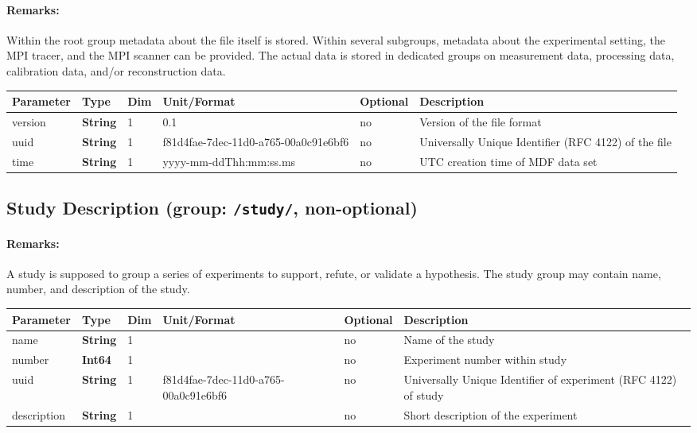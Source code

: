\documentclass[landscape,a4paper]{article} %
\newcommand{\inl}[1]{\lstinline[columns=fixed]{#1}}
\newcommand{\inltab}[1]{{\ttfamily\bfseries\color{blue}#1}}
\newcommand{\inlvar}[1]{{\ttfamily#1}}
\begin{document}
\begin{multicols}{2}
\paragraph{Remarks:} Within the root group metadata about the file itself is stored. Within several subgroups, metadata about the experimental setting, the MPI tracer, and the MPI scanner can be provided. The actual data is stored in dedicated groups on measurement data, processing data, calibration data, and/or reconstruction data.
\end{multicols}

\noindent \begin{tabularx}{\columnwidth}{lllllX} 
\textbf{Parameter} & \textbf{Type} & \textbf{Dim} & \textbf{Unit/Format} & \textbf{Optional} & \textbf{Description} \\ \hline 
\inlvar{version} & \inltab{String} & 1 & 0.1 & no & Version of the file format \\ \hline
\inlvar{uuid} & \inltab{String} & 1 & f81d4fae-7dec-11d0-a765-00a0c91e6bf6 & no & Universally Unique Identifier (RFC 4122) of the file \\ \hline 
\inlvar{time} & \inltab{String} & 1 & yyyy-mm-ddThh:mm:ss.ms & no & UTC creation time of MDF data set \\ \hline
\end{tabularx}


\subsection{Study Description (group: \inl{/study/}, non-optional)}

\begin{multicols}{2}
	\paragraph{Remarks:} A study is supposed to group a series of experiments to support, refute, or validate a hypothesis. The study group may contain \inlvar{name}, \inlvar{number}, and \inlvar{description} of the study.
\end{multicols}

\noindent \begin{tabularx}{\columnwidth}{lllllX} 
\textbf{Parameter} & \textbf{Type} & \textbf{Dim} & \textbf{Unit/Format} & \textbf{Optional} & \textbf{Description} \\ \hline 
\inlvar{name} & \inltab{String} & 1 & & no & Name of the study \\ \hline
\inlvar{number} & \inltab{Int64} & 1 & & no & Experiment number within study \\ \hline
\inlvar{uuid} & \inltab{String} & 1 & f81d4fae-7dec-11d0-a765-00a0c91e6bf6 & no & Universally Unique Identifier of experiment (RFC 4122) of study \\ \hline 
\inlvar{description} & \inltab{String} & 1 & & no & Short description of the experiment \\ \hline
\end{tabularx}
\end{document}
